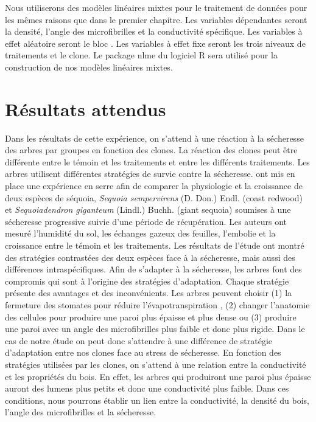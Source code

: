 \documentclass[a4paper,12pt]{report}
\begin{document}
Nous utiliserons des modèles linéaires mixtes pour le traitement de données pour les mêmes raisons que dans le premier chapitre. Les variables dépendantes seront la densité, l'angle des microfibrilles et la conductivité spécifique. Les variables à effet aléatoire seront le bloc . Les variables à effet fixe seront les trois niveaux de traitements et le clone. Le package nlme \citep{NLME2018} du logiciel R sera utilisé pour la construction de nos modèles linéaires mixtes. 

\section{Résultats attendus}

Dans les résultats de cette expérience, on s'attend à une réaction à la sécheresse des arbres par groupes en fonction des clones. La réaction des clones peut être différente entre le témoin et les traitements et entre les différents traitements. Les arbres utilisent différentes stratégies de survie contre la sécheresse. \cite{Ambrose2015} ont mis en place une expérience en serre afin de comparer la physiologie et la croissance de deux espèces de séquoia, \textit{Sequoia sempervirens} (D. Don.) Endl. (coast redwood) et \textit{Sequoiadendron giganteum} (Lindl.) Buchh. (giant sequoia) soumises à une sécheresse progressive suivie d'une période de récupération. Les auteurs ont mesuré l'humidité du sol, les échanges gazeux des feuilles, l'embolie et la croissance entre le témoin et les traitements. Les résultats de l'étude ont montré des stratégies contrastées des deux espèces face à la sécheresse, mais aussi des différences intraspécifiques. Afin de s'adapter à la sécheresse, les arbres font des compromis qui sont à l'origine des stratégies d'adaptation. Chaque stratégie présente des avantages et des  inconvénients. Les arbres peuvent choisir (1) la fermeture des stomates pour réduire l'évapotranspiration \citep{Martinez-Sancho2017}, (2) changer l'anatomie des cellules pour produire une paroi plus épaisse et plus dense ou (3) produire une paroi avec un angle des microfibrilles plus faible et donc plus rigide. Dans le cas de notre étude on peut donc s'attendre à une différence de stratégie d'adaptation entre nos clones face au stress de sécheresse. En fonction des stratégies utilisées par les clones, on s'attend à une relation entre la conductivité et les propriétés du bois. En effet, les arbres qui produiront une paroi plus épaisse auront des lumens plus petits et donc une conductivité plus faible. Dans ces conditions, nous pourrons établir un lien entre la conductivité, la densité du bois, l'angle des microfibrilles et la sécheresse. \\ %
\end{document}
